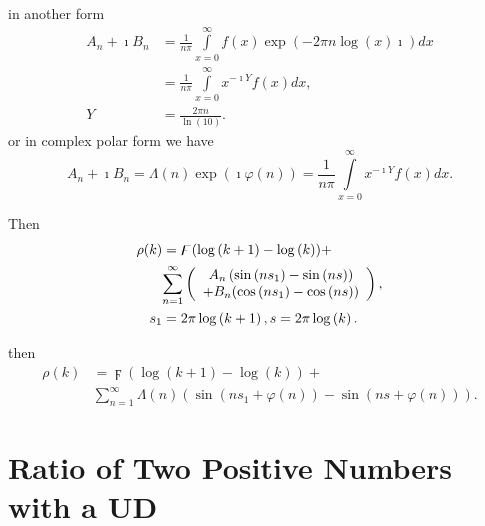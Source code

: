 \documentclass[titlepage,fleqn]{article}%
\begin{document}
\noindent in another form
\begin{align}
A_{n}+\imath B_{n}  &  =\frac{1}{n\pi}%
{\displaystyle\int\limits_{x=0}^{\infty}}
f(x)\exp(-2\pi n\log\left(  x\right)  \imath)dx\label{A_B_Fourier}\\
&  =\frac{1}{n\pi}%
{\displaystyle\int\limits_{x=0}^{\infty}}
x^{-\imath Y}f(x)dx,\nonumber\\
Y  &  =\frac{2\pi n}{\ln(10)}.\nonumber
\end{align}
or in complex polar form we have%
\[
A_{n}+\imath B_{n}=\Lambda(n)\exp(\imath\varphi(n))=\frac{1}{n\pi}%
{\displaystyle\int\limits_{x=0}^{\infty}}
x^{-\imath Y}f(x)dx.
\]


Then%
\begin{align}
\rho(k)  &  =\digamma(\log\left(  k+1\right)  -\log\left(  k\right)
)+\label{Fouri3}\\
&
{\displaystyle\sum\limits_{n=1}^{\infty}}
\left(
\begin{array}
[c]{c}%
A_{n}\left(  \sin\left(  ns_{1}\right)  -\sin\left(  ns\right)  \right) \\
+B_{n}(\cos\left(  ns_{1}\right)  -\cos\left(  ns\right)  )
\end{array}
\right)  ,\nonumber\\
s_{1}  &  =2\pi\log\left(  k+1\right)  ,s=2\pi\log\left(  k\right)  .\nonumber
\end{align}


\noindent then%
\begin{align}
\rho(k)  &  =\digamma(\log\left(  k+1\right)  -\log\left(  k\right)
)+\label{Fouri4}\\
&
{\displaystyle\sum\limits_{n=1}^{\infty}}
\Lambda(n)\left(  \sin\left(  ns_{1}+\varphi(n)\right)  -\sin\left(
ns+\varphi(n)\right)  \right)  .\nonumber
\end{align}


\section{Ratio of Two Positive Numbers with a UD}%

\label{R2PNUD}%
\end{document}
